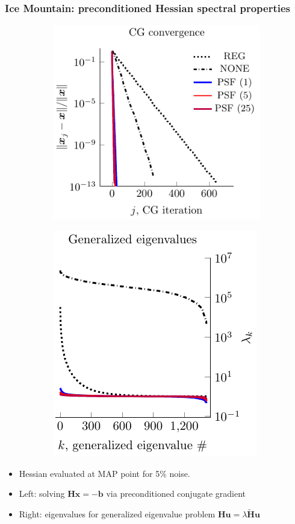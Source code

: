 \documentclass[10pt,final,xcolor=dvipsnames]{beamer}
\begin{document}
\begin{frame}
	\frametitle{Ice Mountain: preconditioned Hessian spectral properties}
\begin{figure}
	\begin{subfigure}{0.53\textwidth}
		\centering
		\includegraphics[scale=0.9]{stokes_pcg_convergence.pdf}
	\end{subfigure}
	\begin{subfigure}{0.46\textwidth}
		\begin{center}
			\includegraphics[scale=0.9]{stokes_geigs_figure.pdf}
		\end{center}
	\end{subfigure}
\end{figure} 
	\begin{itemize}
		\item Hessian evaluated at MAP point for 5\% noise.
		\item Left: solving $\mathbf{H}\mathbf{x}=-\mathbf{b}$ via preconditioned conjugate gradient
		\item Right: eigenvalues for generalized eigenvalue problem $\mathbf{H}\mathbf{u}=\lambda \widetilde{\mathbf{H}}\mathbf{u}$
	\end{itemize}
\end{frame}
\end{document}
